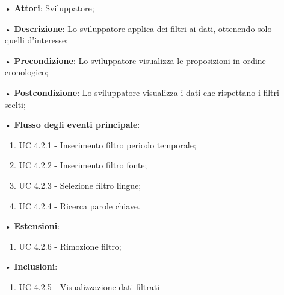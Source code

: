 \begin{itemize}
\item[•]\textbf{Attori}: Sviluppatore;
\item[•]\textbf{Descrizione}: Lo sviluppatore applica dei filtri ai dati, ottenendo solo quelli d'interesse;
\item[•]\textbf{Precondizione}: Lo sviluppatore visualizza le proposizioni in ordine cronologico;
\item[•]\textbf{Postcondizione}: Lo sviluppatore visualizza i dati che rispettano i filtri scelti;
\item[•]\textbf{Flusso degli eventi principale}:
\begin{enumerate}
\item UC 4.2.1 - Inserimento filtro periodo temporale;
\item UC 4.2.2 - Inserimento filtro fonte;
\item UC 4.2.3 - Selezione filtro lingue;
\item UC 4.2.4 - Ricerca parole chiave.
\end{enumerate}
\item[•]\textbf{Estensioni}:
\begin{enumerate}
	\item UC 4.2.6 - Rimozione filtro;
\end{enumerate}
\item[•]\textbf{Inclusioni}:
\begin{enumerate}
\item UC 4.2.5 - Visualizzazione dati filtrati
\end{enumerate}
\end{itemize}
